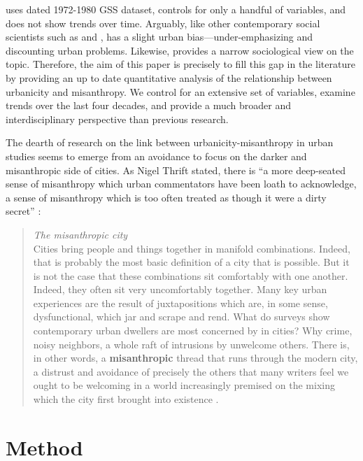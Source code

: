 \documentclass[11pt, letterpaper]{article}
\begin{document}
\begin{spacing}{1.4}
\citet{wilson85} uses dated 1972-1980 GSS dataset, controls for only a
handful of variables, and does not show trends over time.  Arguably, like other contemporary social scientists such as \citet[e.g.,][]{veenhoven94,meyer13} and \citet[e.g.,][]{fischer82}, \citeauthor{wilson85} has a slight urban bias---under-emphasizing and discounting urban problems. Likewise, \citet{wilson85} provides a narrow sociological view on the topic. Therefore, the aim of this paper is precisely to fill this gap in the literature by providing an up to date quantitative analysis of the relationship between urbanicity and misanthropy. We control  for an extensive set of variables, examine trends over the last four decades, and provide a much broader and interdisciplinary perspective than previous research. 

The dearth of research on the link between urbanicity-misanthropy in urban studies seems to emerge from an avoidance to focus on the darker and misanthropic side of cities. As Nigel Thrift stated, there is ``a more deep-seated sense of misanthropy which urban commentators have been loath to acknowledge, a sense of misanthropy which is too often treated as though it were a dirty secret'' \citep[p. 134]{thrift05}: 
\begin{quote}
  \textit{The misanthropic city}\\
  Cities bring people and things together in manifold combinations. Indeed, that is probably the most basic
definition of a city that is possible. But it is not the case that these combinations sit comfortably with one
another. Indeed, they often sit very uncomfortably together. Many key urban experiences are the result of
juxtapositions which are, in some sense, dysfunctional, which jar and scrape and rend. What do surveys
show contemporary urban dwellers are most concerned by in cities? Why crime, noisy neighbors, a whole
raft of intrusions by unwelcome others. There is, in other words, a \textbf{misanthropic} thread that runs through
the modern city, a distrust and avoidance of precisely the others that many writers feel we ought to be
welcoming in a world increasingly premised on the mixing which the city first brought into existence \citep[p. 140 (``misanthropic'' bolded by us]{thrift05}.
\end{quote}



\section*{Method} 


\end{spacing}
\end{document}
